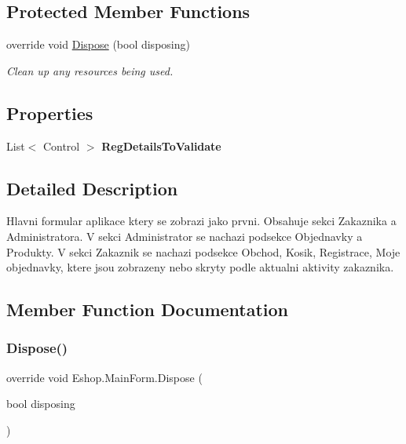 \subsection*{Protected Member Functions}
\begin{DoxyCompactItemize}
\item 
override void \mbox{\hyperlink{class_eshop_1_1_main_form_ad8ec8263043ec42b3b08e5cdf3331e73}{Dispose}} (bool disposing)
\begin{DoxyCompactList}\small\item\em Clean up any resources being used. \end{DoxyCompactList}\end{DoxyCompactItemize}
\subsection*{Properties}
\begin{DoxyCompactItemize}
\item 
\mbox{\label{class_eshop_1_1_main_form_aeb2b914bfa0487af1a16cf6e9377ecc4}} 
List$<$ Control $>$ {\bfseries Reg\+Details\+To\+Validate}
\end{DoxyCompactItemize}


\subsection{Detailed Description}
Hlavni formular aplikace ktery se zobrazi jako prvni. Obsahuje sekci Zakaznika a Administratora. V sekci Administrator se nachazi podsekce Objednavky a Produkty. V sekci Zakaznik se nachazi podsekce Obchod, Kosik, Registrace, Moje objednavky, ktere jsou zobrazeny nebo skryty podle aktualni aktivity zakaznika. 



\subsection{Member Function Documentation}
\mbox{\label{class_eshop_1_1_main_form_ad8ec8263043ec42b3b08e5cdf3331e73}} 
\subsubsection{\texorpdfstring{Dispose()}{Dispose()}}
{\footnotesize\ttfamily override void Eshop.\+Main\+Form.\+Dispose (\begin{DoxyParamCaption}\item[{bool}]{disposing }\end{DoxyParamCaption})\hspace{0.3cm}{\ttfamily [protected]}}



